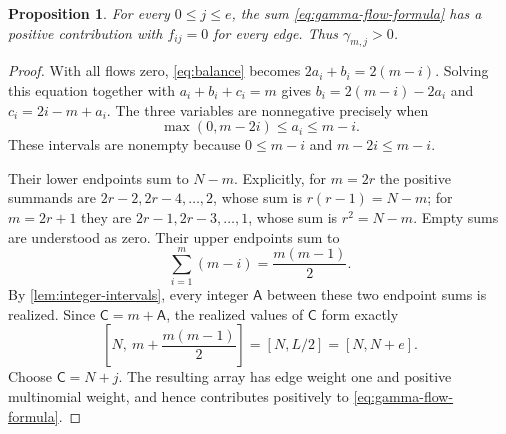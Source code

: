 \documentclass[reqno, 12pt]{article}
\numberwithin{equation}{section}
\newtheorem{proposition}[theorem]{Proposition}
\theoremstyle{definition}
\begin{document}
\begin{proposition}\label{prop:strict-gamma}
For every $0\leq j\leq e$, the sum
\eqref{eq:gamma-flow-formula} has a positive contribution with
$f_{ij}=0$ for every edge.  Thus $\gamma_{m,j}>0$.
\end{proposition}
\begin{proof}
With all flows zero, \eqref{eq:balance} becomes
$2a_i+b_i=2(m-i)$.  Solving this equation together with
$a_i+b_i+c_i=m$ gives $b_i=2(m-i)-2a_i$ and $c_i=2i-m+a_i$.
The three variables are nonnegative precisely when
\begin{equation}\label{eq:zero-flow-intervals}
\max(0,m-2i)\leq a_i\leq m-i.
\end{equation}
These intervals are nonempty because $0\leq m-i$ and
$m-2i\leq m-i$.

Their lower endpoints sum to $N-m$.  Explicitly, for $m=2r$ the positive summands are $2r-2,2r-4,\ldots,2$, whose sum is
$r(r-1)=N-m$; for $m=2r+1$ they are $2r-1,2r-3,\ldots,1$, whose sum is $r^2=N-m$.
Empty sums are understood as zero. Their upper endpoints sum to
\[\sum_{i=1}^m(m-i)=\frac{m(m-1)}2.
\]
By \cref{lem:integer-intervals}, every integer $\mathsf A$ between these two endpoint sums is realized.
Since $\mathsf C=m+\mathsf A$, the realized values of
$\mathsf C$ form exactly
\[
\left[N,\ m+\frac{m(m-1)}2\right]
=[N,L/2]=[N,N+e].
\]
Choose $\mathsf C=N+j$.  The resulting array has edge
weight one and positive multinomial weight, and hence contributes
positively to \eqref{eq:gamma-flow-formula}.
\end{proof}
\end{document}
